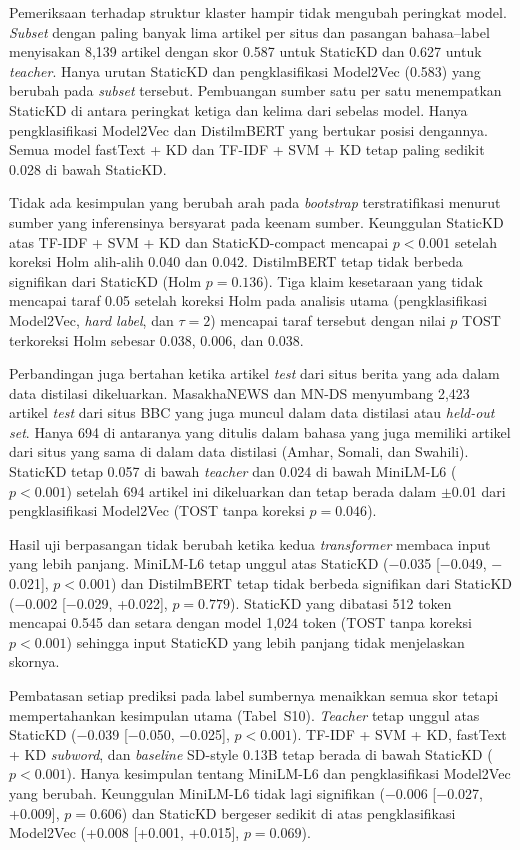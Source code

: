 \documentclass{ieeeaccess}
\newcommand{\en}[1]{\textit{#1}}
\begin{document}
Pemeriksaan terhadap struktur klaster hampir tidak mengubah peringkat model. \en{Subset} dengan paling banyak lima artikel per situs dan pasangan bahasa--label menyisakan 8,139 artikel dengan skor 0.587 untuk StaticKD dan 0.627 untuk \en{teacher}. Hanya urutan StaticKD dan pengklasifikasi Model2Vec (0.583) yang berubah pada \en{subset} tersebut. Pembuangan sumber satu per satu menempatkan StaticKD di antara peringkat ketiga dan kelima dari sebelas model. Hanya pengklasifikasi Model2Vec dan DistilmBERT yang bertukar posisi dengannya. Semua model fastText + KD dan TF-IDF + SVM + KD tetap paling sedikit 0.028 di bawah StaticKD.

Tidak ada kesimpulan yang berubah arah pada \en{bootstrap} terstratifikasi menurut sumber yang inferensinya bersyarat pada keenam sumber. Keunggulan StaticKD atas TF-IDF + SVM + KD dan StaticKD-compact mencapai $p<0.001$ setelah koreksi Holm alih-alih 0.040 dan 0.042. DistilmBERT tetap tidak berbeda signifikan dari StaticKD (Holm $p=0.136$). Tiga klaim kesetaraan yang tidak mencapai taraf 0.05 setelah koreksi Holm pada analisis utama (pengklasifikasi Model2Vec, \en{hard label}, dan $\tau=2$) mencapai taraf tersebut dengan nilai $p$ TOST terkoreksi Holm sebesar 0.038, 0.006, dan 0.038.

Perbandingan juga bertahan ketika artikel \en{test} dari situs berita yang ada dalam data distilasi dikeluarkan. MasakhaNEWS dan MN-DS menyumbang 2,423 artikel \en{test} dari situs BBC yang juga muncul dalam data distilasi atau \en{held-out set}. Hanya 694 di antaranya yang ditulis dalam bahasa yang juga memiliki artikel dari situs yang sama di dalam data distilasi (Amhar, Somali, dan Swahili). StaticKD tetap 0.057 di bawah \en{teacher} dan 0.024 di bawah MiniLM-L6 ($p<0.001$) setelah 694 artikel ini dikeluarkan dan tetap berada dalam $\pm$0.01 dari pengklasifikasi Model2Vec (TOST tanpa koreksi $p=0.046$).

Hasil uji berpasangan tidak berubah ketika kedua \en{transformer} membaca input yang lebih panjang. MiniLM-L6 tetap unggul atas StaticKD ($-$0.035 [$-$0.049, $-$0.021], $p<0.001$) dan DistilmBERT tetap tidak berbeda signifikan dari StaticKD ($-$0.002 [$-$0.029, +0.022], $p=0.779$). StaticKD yang dibatasi 512 token mencapai 0.545 dan setara dengan model 1,024 token (TOST tanpa koreksi $p<0.001$) sehingga input StaticKD yang lebih panjang tidak menjelaskan skornya.

Pembatasan setiap prediksi pada label sumbernya menaikkan semua skor tetapi mempertahankan kesimpulan utama (Tabel~S10). \en{Teacher} tetap unggul atas StaticKD ($-$0.039 [$-$0.050, $-$0.025], $p<0.001$). TF-IDF + SVM + KD, fastText + KD \en{subword}, dan \en{baseline} SD-style 0.13B tetap berada di bawah StaticKD ($p<0.001$). Hanya kesimpulan tentang MiniLM-L6 dan pengklasifikasi Model2Vec yang berubah. Keunggulan MiniLM-L6 tidak lagi signifikan ($-$0.006 [$-$0.027, +0.009], $p=0.606$) dan StaticKD bergeser sedikit di atas pengklasifikasi Model2Vec (+0.008 [+0.001, +0.015], $p=0.069$).
\end{document}
